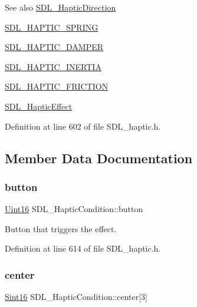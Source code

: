 \begin{DoxySeeAlso}{See also}
\mbox{\hyperlink{struct_s_d_l___haptic_direction}{S\+D\+L\+\_\+\+Haptic\+Direction}} 

\mbox{\hyperlink{_s_d_l__haptic_8h_a3b52d4700380085e2b5d87bb20320fb1}{S\+D\+L\+\_\+\+H\+A\+P\+T\+I\+C\+\_\+\+S\+P\+R\+I\+NG}} 

\mbox{\hyperlink{_s_d_l__haptic_8h_a69522f261973e3ea4273486141320a87}{S\+D\+L\+\_\+\+H\+A\+P\+T\+I\+C\+\_\+\+D\+A\+M\+P\+ER}} 

\mbox{\hyperlink{_s_d_l__haptic_8h_a14b807471589120395aec28293cf6642}{S\+D\+L\+\_\+\+H\+A\+P\+T\+I\+C\+\_\+\+I\+N\+E\+R\+T\+IA}} 

\mbox{\hyperlink{_s_d_l__haptic_8h_a98a5011311168d63921aaac21403a4d8}{S\+D\+L\+\_\+\+H\+A\+P\+T\+I\+C\+\_\+\+F\+R\+I\+C\+T\+I\+ON}} 

\mbox{\hyperlink{union_s_d_l___haptic_effect}{S\+D\+L\+\_\+\+Haptic\+Effect}} 
\end{DoxySeeAlso}


Definition at line 602 of file S\+D\+L\+\_\+haptic.\+h.



\subsection{Member Data Documentation}
\mbox{\label{struct_s_d_l___haptic_condition_acd35a9d432ad122bf7824b16974eac7a}} 
\subsubsection{\texorpdfstring{button}{button}}
{\footnotesize\ttfamily \mbox{\hyperlink{_s_d_l__stdinc_8h_a31fcc0a076c9068668173ee26d33e42b}{Uint16}} S\+D\+L\+\_\+\+Haptic\+Condition\+::button}

Button that triggers the effect. 

Definition at line 614 of file S\+D\+L\+\_\+haptic.\+h.

\mbox{\label{struct_s_d_l___haptic_condition_a8a71ec28ff5ab85246cbc59736aa2c53}} 
\subsubsection{\texorpdfstring{center}{center}}
{\footnotesize\ttfamily \mbox{\hyperlink{_s_d_l__stdinc_8h_a9d0257032c0e146ab6121bf0122712f5}{Sint16}} S\+D\+L\+\_\+\+Haptic\+Condition\+::center\mbox{[}3\mbox{]}}


